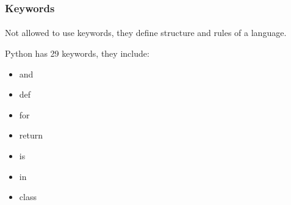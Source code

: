 




\begin{frame}\frametitle{Keywords}
    \framesubtitle{}

    Not allowed to use keywords, they define structure and rules of a language.

    Python has 29 keywords, they include:

    \begin{itemize}
        \item and
        \item def
        \item for
        \item return
        \item is
        \item in
        \item class
    \end{itemize}


\end{frame}










